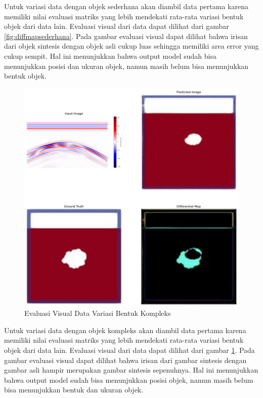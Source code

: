 Untuk variasi data dengan objek sederhana akan diambil data pertama karena memiliki nilai evaluasi matriks yang lebih mendekati rata-rata variasi bentuk objek dari data lain. 
Evaluasi visual dari data dapat dilihat dari gambar \ref{fig:diffmapsederhana}.
Pada gambar evaluasi visual dapat dilihat bahwa irisan dari objek sintesis dengan objek asli cukup luas sehingga memiliki area error yang cukup sempit. 
Hal ini menunjukkan bahwa output model sudah bisa menunjukkan posisi dan ukuran objek, namun masih belum bisa menunjukkan bentuk objek.

\begin{figure}[ht]
  \centering
  \includegraphics[scale=0.15]{gambar/diffMapKompleks.jpg}
  \caption{Evaluasi Visual Data Variasi Bentuk Kompleks}
  \label{fig:diffmapkompleks}
\end{figure}
\newpage
Untuk variasi data dengan objek kompleks akan diambil data pertama karena memiliki nilai evaluasi matriks yang lebih mendekati rata-rata variasi bentuk objek dari data lain. 
Evaluasi visual dari data dapat dilihat dari gambar \ref{fig:diffmapkompleks}. 
Pada gambar evaluasi visual dapat dilihat bahwa irisan dari gambar sintesis dengan gambar asli hampir merupakan gambar sintesis sepenuhnya. 
Hal ini menunjukkan bahwa output model sudah bisa menunjukkan posisi objek, namun masih belum bisa menunjukkan bentuk dan ukuran objek.


